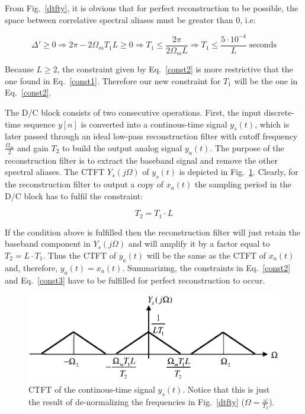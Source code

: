 \documentclass[a4paper,11pt,oneside]{article}
\begin{document}
From Fig.~\ref{dtfty}, it is obvious that for perfect reconstruction to be possible, the space between correlative spectral aliases must be greater than 0, i.e:

\begin{equation}\label{const2}
\Delta'\geq 0 \Rightarrow 2\pi-2\Omega_mT_1L\geq 0 \Rightarrow T_1 \leq \frac{2\pi}{2\Omega_m L} \Rightarrow T_{1} \leq \frac{5\cdot 10^{-4}}{L} \; \textrm{seconds}
\end{equation}

Because $L\geq 2$, the constraint given by Eq.~\ref{const2} is more restrictive that the one found in Eq.~\ref{const1}. Therefore our new constraint for $T_1$ will be the one in Eq.~\ref{const2}.

The D/C block consists of two consecutive operations. First, the input discrete-time sequence $y[n]$ is converted into a continous-time signal $y_s(t)$, which is later passed through an ideal low-pass reconstruction filter with cutoff frequency $\frac{\Omega_m}{2}$ and gain $T_2$ to build the output analog signal $y_a(t)$. The purpose of the reconstruction filter is to extract the baseband signal and remove the other spectral aliases. The CTFT $Y_s(j\Omega)$ of $y_s(t)$ is depicted in Fig.~\ref{ctftys}. Clearly, for the reconstruction filter to output a copy of $x_{a}(t)$ the sampling period in the D/C block has to fulfil the constraint: 

\begin{equation}\label{const3}
T_2=T_1\cdot L
\end{equation}

If the condition above is fulfilled then the reconstruction filter will just retain the baseband component in $Y_s(j\Omega)$ and will amplify it by a factor equal to $T_2=L\cdot T_1$. Thus the CTFT of $y_a(t)$ will be the same as the CTFT of $x_a(t)$ and, therefore, $y_a(t)=x_a(t)$. Summarizing, the constraints in Eq.~\ref{const2} and Eq.~\ref{const3} have to be fulfilled for perfect reconstruction to occur.

\begin{figure}[h!]
\centering
\includegraphics[width=.8\textwidth]{ctftys.eps}
\caption{CTFT of the continous-time signal $y_s(t)$. Notice that this is just the result of de-normalizing the frequencies in Fig.~\ref{dtfty} ($\Omega=\frac{\omega}{T_2}$).}
\label{ctftys}
\end{figure}
\end{document}
